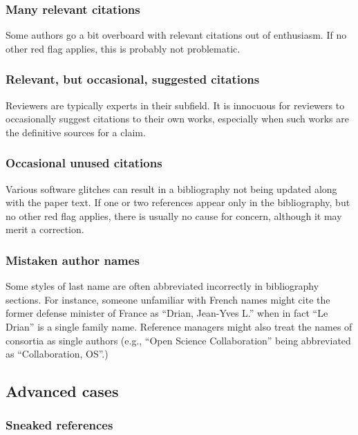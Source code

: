 \documentclass[letterpaper, 12pt]{article}
\begin{document}
\subsubsection*{Many relevant citations}

Some authors go a bit overboard with
relevant citations out of enthusiasm. If no other red flag applies,
this is probably not problematic.

\subsubsection*{Relevant, but occasional, suggested citations}

Reviewers are typically experts in their subfield. It is innocuous for reviewers to occasionally suggest citations to their own works, especially when such works are the definitive sources for a claim.

\subsubsection*{Occasional unused citations}

Various software glitches can result in a bibliography not being updated along with the paper text.
If one or two references appear only in the bibliography, but no other red flag applies, there is usually no cause for concern, although it may merit a correction.

\subsubsection*{Mistaken author names}

Some styles of last name are often abbreviated incorrectly in bibliography sections.
For instance, someone unfamiliar with French names might cite the former defense minister of France as ``Drian, Jean-Yves L.''
when in fact ``Le Drian'' is a single family name. Reference managers might also treat the names of consortia as single authors (e.g., ``Open Science Collaboration'' being abbreviated as ``Collaboration, OS''.)

\subsection*{Advanced cases}

\subsubsection*{Sneaked references}
\end{document}
